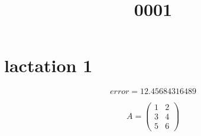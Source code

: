 \documentclass{article}
\title{0001}
\date{}
\author{}
\begin{document}
\maketitle

\section{lactation 1}$$error = 12.45684316489$$

$$A = \begin{pmatrix}
1&2\\
3&4\\
5&6
\end{pmatrix}$$
\end{document}
